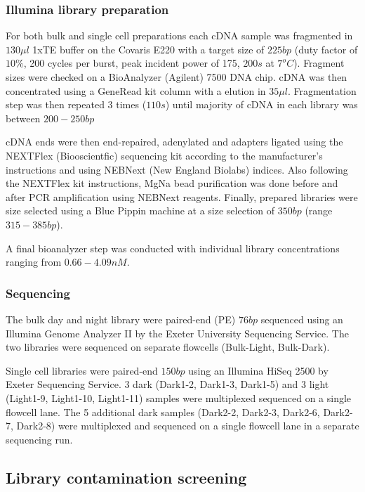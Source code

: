 \subsubsection{Illumina library preparation}

For both bulk and single cell preparations each cDNA sample was fragmented in \(130\mu l\) 1xTE buffer on the Covaris E220 
with a target size of \(225bp\) (duty factor of \(10\%\), 200 cycles per burst, peak incident power
of 175, \(200s\) at \(7^{o}C\)). Fragment sizes were checked on a BioAnalyzer (Agilent) 7500 DNA chip.
cDNA was then concentrated using a GeneRead kit column with a elution in \(35\mu l\). Fragmentation
step was then repeated 3 times (\(110s\)) until majority of cDNA in each library was between \(200-250bp\)

cDNA ends were then end-repaired, adenylated and adapters ligated using the NEXTFlex (Biooscientfic) sequencing kit 
according to the manufacturer's instructions and using NEBNext (New England Biolabs) indices.  Also following
the NEXTFlex kit instructions, MgNa bead purification was done before and after PCR amplification using
NEBNext reagents.  Finally, prepared libraries were size selected using a Blue Pippin machine at a size selection
of \(350bp\) (range \(315-385bp\)).

A final bioanalyzer step was conducted with individual library concentrations ranging from \(0.66-4.09nM\).


\subsubsection{Sequencing}

The bulk day and night library were paired-end (PE) \(76bp\) sequenced using an Illumina Genome
Analyzer II by the Exeter University Sequencing Service.  The two libraries were sequenced
on separate flowcells (Bulk-Light, Bulk-Dark).

Single cell libraries were paired-end \(150bp\) using an Illumina HiSeq 2500 by Exeter
Sequencing Service. 3 dark (Dark1-2, Dark1-3, Dark1-5) and 3 light (Light1-9, Light1-10, Light1-11)
samples were multiplexed sequenced on a single flowcell lane.  The 5 additional 
dark samples (Dark2-2, Dark2-3, Dark2-6, Dark2-7, Dark2-8) were multiplexed and sequenced on a single
flowcell lane in a separate sequencing run.

\subsection{Library contamination screening}

